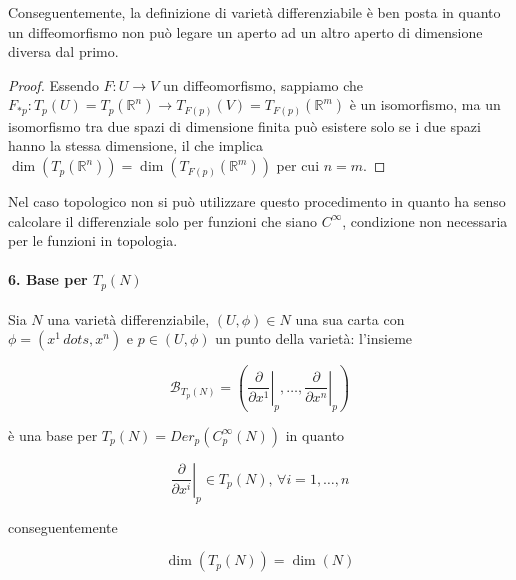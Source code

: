 Conseguentemente, la definizione di varietà differenziabile è ben posta in quanto un diffeomorfismo non può legare un aperto ad un altro aperto di dimensione diversa dal primo.

\begin{proof}
	Essendo $ F : U \to V $ un diffeomorfismo, sappiamo che $ F_{*p} : T_{p}(U) = T_{p}(\mathbb{R}^{n}) \to T_{F(p)}(V) = T_{F(p)}(\mathbb{R}^{m}) $ è un isomorfismo, ma un isomorfismo tra due spazi di dimensione finita può esistere solo se i due spazi hanno la stessa dimensione, il che implica $ \dim(T_{p}(\mathbb{R}^{n})) = \dim(T_{F(p)}(\mathbb{R}^{m})) $ per cui $ n=m $.
\end{proof}

Nel caso topologico non si può utilizzare questo procedimento in quanto ha senso calcolare il differenziale solo per funzioni che siano $ C^{\infty} $, condizione non necessaria per le funzioni in topologia.

\paragraph{6. Base per $ T_{p}(N) $}

Sia $ N $ una varietà differenziabile, $ (U,\phi) \in N $ una sua carta con $ \phi = (x^{1}\,dots,x^{n}) $ e $ p \in (U,\phi) $ un punto della varietà: l'insieme

\begin{equation}
	\mathcal{B}_{T_{p}(N)} = \left( \left. \dfrac{\partial}{\partial x^{1}} \right|_{p} , \dots , \left. \dfrac{\partial}{\partial x^{n}} \right|_{p} \right)
\end{equation}

è una base per $ T_{p}(N) = Der_{p}(C_{p}^{\infty}(N)) $ in quanto

\begin{equation}
	\left. \dfrac{\partial}{\partial x^{i}} \right|_{p} \in T_{p}(N), \, \forall i=1,\dots,n
\end{equation}

conseguentemente

\begin{equation}
	\dim(T_{p}(N)) = \dim(N)
\end{equation}


